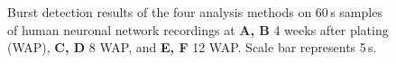 \documentclass[12pt, titlepage]{article}
\begin{document}
		\begin{figure}[h]
			\centering
			\caption{Burst detection results of the four analysis methods on 60$\,$s samples of human neuronal network recordings at \textbf{A, B} 4 weeks after plating (WAP), \textbf{C, D} 8 WAP, and \textbf{E, F} 12 WAP. Scale bar represents 5$\,$s.}
			\label{hiPSN_examples}
		\end{figure}
		\clearpage
                 
		 
\end{document}

